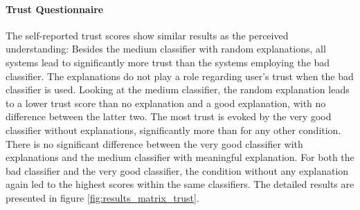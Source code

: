 \paragraph{Trust Questionnaire}
The self-reported trust scores show similar results as the perceived understanding: Besides the medium classifier with random explanations, all systems lead to significantly more trust than the systems employing the bad classifier. The explanations do not play a role regarding user's trust when the bad classifier is used. Looking at the medium classifier, the random explanation leads to a lower trust score than no explanation and a good explanation, with no difference between the latter two. The most trust is evoked by the very good classifier without explanations, significantly more than for any other condition. There is no significant difference between the very good classifier with explanations and the medium classifier with meaningful explanation. For both the bad classifier and the very good classifier, the condition without any explanation again led to the highest scores within the same classifiers. The detailed results are presented in figure \ref{fig:results_matrix_trust}.

\begin{table}[h]
	\caption{Mean scores for self-reported trust measure}
	\label{fig:results_table_trust}
\end{table}

